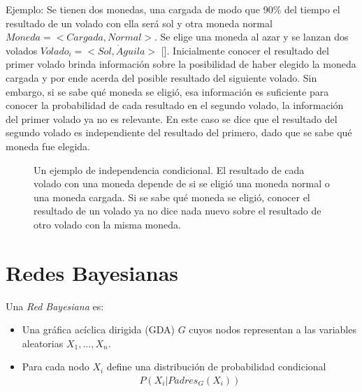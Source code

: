 Ejemplo: Se tienen dos monedas, una cargada de modo que 90\% del tiempo el resultado de un volado con ella será sol y otra moneda normal $Moneda = <Cargada, Normal>$.  Se elige una moneda al azar y se lanzan dos volados $Volado_i=<Sol, \acute{A}guila>$ [].  Inicialmente conocer el resultado del primer volado brinda información sobre la posibilidad de haber elegido la moneda cargada y por ende acerda del posible resultado del siguiente volado.  Sin embargo, si se sabe qué moneda se eligió, esa información es suficiente para conocer la probabilidad de cada resultado en el segundo volado, la información del primer volado ya no es relevante.  En este caso se dice que el resultado del segundo volado es independiente del resultado del primero, dado que se sabe qué moneda fue elegida.

\begin{figure}
 \centering
 \caption{Un ejemplo de independencia condicional.  El resultado de cada volado con una moneda depende de si se eligió una moneda normal o una moneda cargada.  Si se sabe qué moneda se eligió, conocer el resultado de un volado ya no dice nada nuevo sobre el resultado de otro volado con la misma moneda.}\label{fig:condicionalMoneda}
\end{figure}


\section{Redes Bayesianas}

\begin{definition}
 Una \emph{Red Bayesiana} es:
 \begin{itemize}
  \item Una gráfica acíclica dirigida (GDA) $G$ cuyos nodos representan a las variables aleatorias $X_1,...,X_n$.
  \item Para cada nodo $X_i$ define una distribución de probabilidad condicional
  \begin{align}
   P(X_i|Padres_G(X_i))
  \end{align}
 \end{itemize}
\end{definition}


